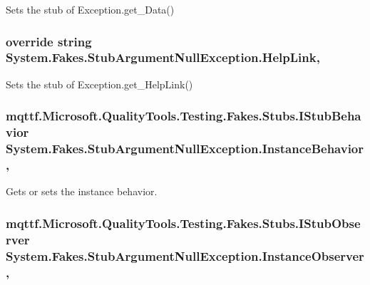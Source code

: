 Sets the stub of Exception.\-get\-\_\-\-Data()

\hypertarget{class_system_1_1_fakes_1_1_stub_argument_null_exception_a9d49f02b631fe75b844d83bbac406444}{
\subsubsection[{Help\-Link}]{\setlength{\rightskip}{0pt plus 5cm}override string System.\-Fakes.\-Stub\-Argument\-Null\-Exception.\-Help\-Link\hspace{0.3cm}{\ttfamily [get]}, {\ttfamily [set]}}}\label{class_system_1_1_fakes_1_1_stub_argument_null_exception_a9d49f02b631fe75b844d83bbac406444}


Sets the stub of Exception.\-get\-\_\-\-Help\-Link()

\hypertarget{class_system_1_1_fakes_1_1_stub_argument_null_exception_aa84acec53b7ef992c566869ec60b1b45}{
\subsubsection[{Instance\-Behavior}]{\setlength{\rightskip}{0pt plus 5cm}mqttf.\-Microsoft.\-Quality\-Tools.\-Testing.\-Fakes.\-Stubs.\-I\-Stub\-Behavior System.\-Fakes.\-Stub\-Argument\-Null\-Exception.\-Instance\-Behavior\hspace{0.3cm}{\ttfamily [get]}, {\ttfamily [set]}}}\label{class_system_1_1_fakes_1_1_stub_argument_null_exception_aa84acec53b7ef992c566869ec60b1b45}


Gets or sets the instance behavior.

\hypertarget{class_system_1_1_fakes_1_1_stub_argument_null_exception_a010b3cfeac6f5e670a3d10eadc2eede5}{
\subsubsection[{Instance\-Observer}]{\setlength{\rightskip}{0pt plus 5cm}mqttf.\-Microsoft.\-Quality\-Tools.\-Testing.\-Fakes.\-Stubs.\-I\-Stub\-Observer System.\-Fakes.\-Stub\-Argument\-Null\-Exception.\-Instance\-Observer\hspace{0.3cm}{\ttfamily [get]}, {\ttfamily [set]}}}\label{class_system_1_1_fakes_1_1_stub_argument_null_exception_a010b3cfeac6f5e670a3d10eadc2eede5}



